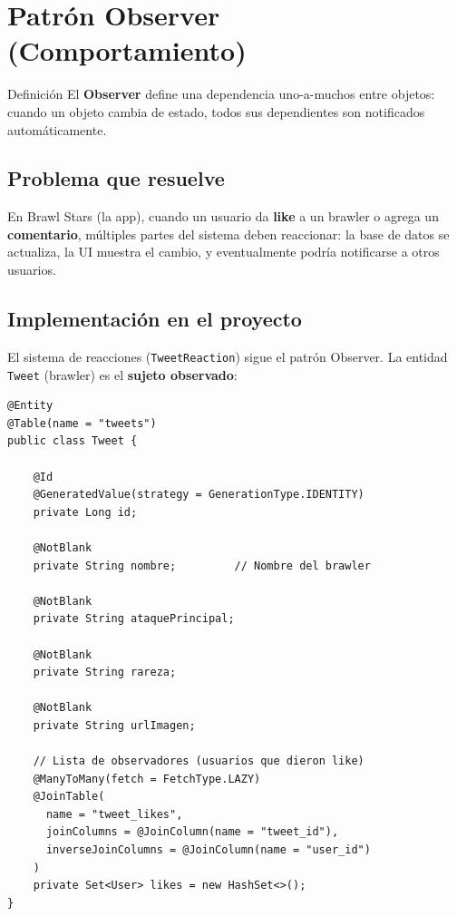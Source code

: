 \documentclass[12pt,a4paper]{article}
\begin{document}
\newpage
\section{Patr\'on Observer (Comportamiento)}

\begin{patronbox}{Definici\'on}
El \textbf{Observer} define una dependencia uno-a-muchos entre objetos: cuando un objeto cambia de estado, todos sus dependientes son notificados autom\'aticamente.
\end{patronbox}

\subsection{Problema que resuelve}

En Brawl Stars (la app), cuando un usuario da \textbf{like} a un brawler o agrega un \textbf{comentario}, m\'ultiples partes del sistema deben reaccionar: la base de datos se actualiza, la UI muestra el cambio, y eventualmente podr\'ia notificarse a otros usuarios.

\subsection{Implementaci\'on en el proyecto}

El sistema de reacciones (\texttt{TweetReaction}) sigue el patr\'on Observer. La entidad \texttt{Tweet} (brawler) es el \textbf{sujeto observado}:

\begin{lstlisting}[caption={Tweet.java -- El sujeto observado con su lista de likes}]
@Entity
@Table(name = "tweets")
public class Tweet {

    @Id
    @GeneratedValue(strategy = GenerationType.IDENTITY)
    private Long id;

    @NotBlank
    private String nombre;         // Nombre del brawler

    @NotBlank
    private String ataquePrincipal;

    @NotBlank
    private String rareza;

    @NotBlank
    private String urlImagen;

    // Lista de observadores (usuarios que dieron like)
    @ManyToMany(fetch = FetchType.LAZY)
    @JoinTable(
      name = "tweet_likes",
      joinColumns = @JoinColumn(name = "tweet_id"),
      inverseJoinColumns = @JoinColumn(name = "user_id")
    )
    private Set<User> likes = new HashSet<>();
}
\end{lstlisting}
\end{document}
